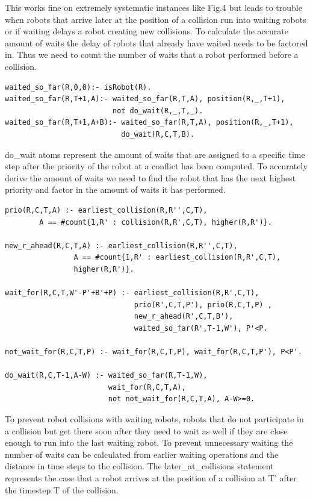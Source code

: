 \documentclass{llncs}
\begin{document}
This works fine on extremely systematic instances like Fig.4 but leads to trouble when robots that arrive later at the position of a collision run into waiting robots or if waiting delays a robot creating new collisions.
To calculate the accurate amount of waits the delay of robots that already have waited needs to be factored in. Thus we need to count the number of waits that a robot performed before a collision. 
\begin{verbatim}
waited_so_far(R,0,0):- isRobot(R).
waited_so_far(R,T+1,A):- waited_so_far(R,T,A), position(R,_,T+1),
                         not do_wait(R,_,T,_).
waited_so_far(R,T+1,A+B):- waited_so_far(R,T,A), position(R,_,T+1),
                           do_wait(R,C,T,B).
\end{verbatim}
do\_wait atoms represent the amount of waits that are assigned to a specific time step after the priority of the robot at a conflict has been computed.
To accurately derive the amount of waits we need to find the robot that has the next highest priority and factor in the amount of waits it has performed.
\begin{verbatim}
prio(R,C,T,A) :- earliest_collision(R,R'',C,T),  
        A == #count{1,R' : collision(R,R',C,T), higher(R,R')}.

new_r_ahead(R,C,T,A) :- earliest_collision(R,R'',C,T),
                A == #count{1,R' : earliest_collision(R,R',C,T), 
                higher(R,R')}.

wait_for(R,C,T,W'-P'+B'+P) :- earliest_collision(R,R',C,T), 
                              prio(R',C,T,P'), prio(R,C,T,P) , 
                              new_r_ahead(R',C,T,B'), 
                              waited_so_far(R',T-1,W'), P'<P.

not_wait_for(R,C,T,P) :- wait_for(R,C,T,P), wait_for(R,C,T,P'), P<P'.

do_wait(R,C,T-1,A-W) :- waited_so_far(R,T-1,W), 
                        wait_for(R,C,T,A), 
                        not not_wait_for(R,C,T,A), A-W>=0.
\end{verbatim}
To prevent robot collisions with waiting robots, robots that do not participate in a collision but get there soon after they need to wait as well if they are close enough to run into the last waiting robot. To prevent unnecessary waiting the number of waits can be calculated from earlier waiting operations and the distance in time steps to the collision. The later\_at\_collisions statement represents the case that a robot arrives at the position of a collision at T' after the timestep T of the collision.
\end{document}
